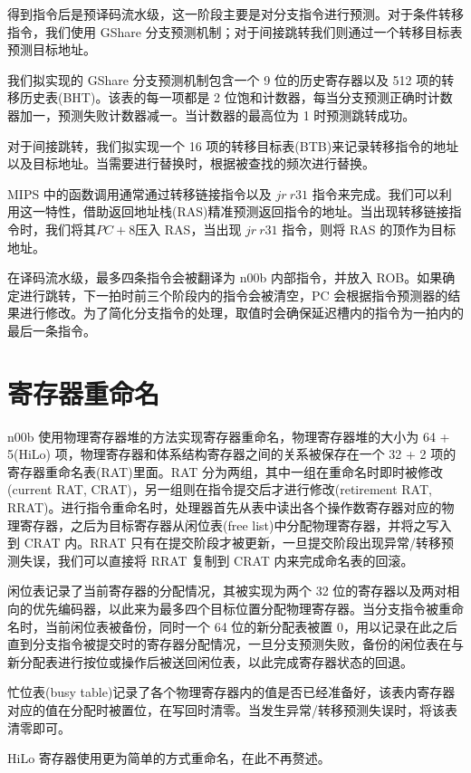 \documentclass[blue,normal,cn]{elegantnote}
\begin{document}
得到指令后是预译码流水级，这一阶段主要是对分支指令进行预测。对于条件转移指令，我们使用 GShare 分支预测机制；对于间接跳转我们则通过一个转移目标表预测目标地址。

我们拟实现的 GShare 分支预测机制包含一个 9 位的历史寄存器以及 512 项的转移历史表(BHT)。该表的每一项都是 2 位饱和计数器，每当分支预测正确时计数器加一，预测失败计数器减一。当计数器的最高位为 1 时预测跳转成功。

对于间接跳转，我们拟实现一个 16 项的转移目标表(BTB)来记录转移指令的地址以及目标地址。当需要进行替换时，根据被查找的频次进行替换。

MIPS 中的函数调用通常通过转移链接指令以及 $jr\ r31$ 指令来完成。我们可以利用这一特性，借助返回地址栈(RAS)精准预测返回指令的地址。当出现转移链接指令时，我们将其$PC + 8$压入 RAS，当出现 $jr\ r31$ 指令，则将 RAS 的顶作为目标地址。

在译码流水级，最多四条指令会被翻译为 n00b 内部指令，并放入 ROB。如果确定进行跳转，下一拍时前三个阶段内的指令会被清空，PC 会根据指令预测器的结果进行修改。为了简化分支指令的处理，取值时会确保延迟槽内的指令为一拍内的最后一条指令。

\section{寄存器重命名}

n00b 使用物理寄存器堆的方法实现寄存器重命名，物理寄存器堆的大小为 64 + 5(HiLo) 项，物理寄存器和体系结构寄存器之间的关系被保存在一个 32 + 2 项的寄存器重命名表(RAT)里面。RAT 分为两组，其中一组在重命名时即时被修改(current RAT, CRAT)，另一组则在指令提交后才进行修改(retirement RAT, RRAT)。进行指令重命名时，处理器首先从表中读出各个操作数寄存器对应的物理寄存器，之后为目标寄存器从闲位表(free list)中分配物理寄存器，并将之写入到 CRAT 内。RRAT 只有在提交阶段才被更新，一旦提交阶段出现异常/转移预测失误，我们可以直接将 RRAT 复制到 CRAT 内来完成命名表的回滚。

闲位表记录了当前寄存器的分配情况，其被实现为两个 32 位的寄存器以及两对相向的优先编码器，以此来为最多四个目标位置分配物理寄存器。当分支指令被重命名时，当前闲位表被备份，同时一个 64 位的新分配表被置 0，用以记录在此之后直到分支指令被提交时的寄存器分配情况，一旦分支预测失败，备份的闲位表在与新分配表进行按位或操作后被送回闲位表，以此完成寄存器状态的回退。

忙位表(busy table)记录了各个物理寄存器内的值是否已经准备好，该表内寄存器对应的值在分配时被置位，在写回时清零。当发生异常/转移预测失误时，将该表清零即可。

HiLo 寄存器使用更为简单的方式重命名，在此不再赘述。
\end{document}
